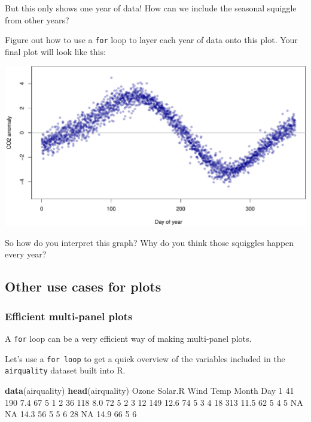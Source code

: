 \documentclass[
]{book}
\newenvironment{Shaded}{\begin{snugshade}}{\end{snugshade}}
\newcommand{\DecValTok}[1]{\textcolor[rgb]{0.00,0.00,0.81}{#1}}
\newcommand{\FloatTok}[1]{\textcolor[rgb]{0.00,0.00,0.81}{#1}}
\newcommand{\KeywordTok}[1]{\textcolor[rgb]{0.13,0.29,0.53}{\textbf{#1}}}
\newcommand{\NormalTok}[1]{#1}
\newcommand{\OtherTok}[1]{\textcolor[rgb]{0.56,0.35,0.01}{#1}}
\begin{document}
But this only shows one year of data! How can we include the seasonal squiggle from other years?

Figure out how to use a \texttt{for} loop to layer each year of data onto this plot. Your final plot will look like this:

\includegraphics{figures/unnamed-chunk-312-1.pdf}

So how do you interpret this graph? Why do you think those squiggles happen every year?

\hypertarget{other-use-cases-for-plots}{%
\subsection*{Other use cases for plots}\label{other-use-cases-for-plots}}

\hypertarget{efficient-multi-panel-plots}{%
\subsubsection*{Efficient multi-panel plots}\label{efficient-multi-panel-plots}}

A \texttt{for} loop can be a very efficient way of making multi-panel plots.

Let's use a \texttt{for\ loop} to get a quick overview of the variables included in the \texttt{airquality} dataset built into R.

\begin{Shaded}
\begin{Highlighting}[]
\KeywordTok{data}\NormalTok{(airquality)}
\KeywordTok{head}\NormalTok{(airquality)}
\NormalTok{  Ozone Solar.R Wind Temp Month Day}
\DecValTok{1}    \DecValTok{41}     \DecValTok{190}  \FloatTok{7.4}   \DecValTok{67}     \DecValTok{5}   \DecValTok{1}
\DecValTok{2}    \DecValTok{36}     \DecValTok{118}  \FloatTok{8.0}   \DecValTok{72}     \DecValTok{5}   \DecValTok{2}
\DecValTok{3}    \DecValTok{12}     \DecValTok{149} \FloatTok{12.6}   \DecValTok{74}     \DecValTok{5}   \DecValTok{3}
\DecValTok{4}    \DecValTok{18}     \DecValTok{313} \FloatTok{11.5}   \DecValTok{62}     \DecValTok{5}   \DecValTok{4}
\DecValTok{5}    \OtherTok{NA}      \OtherTok{NA} \FloatTok{14.3}   \DecValTok{56}     \DecValTok{5}   \DecValTok{5}
\DecValTok{6}    \DecValTok{28}      \OtherTok{NA} \FloatTok{14.9}   \DecValTok{66}     \DecValTok{5}   \DecValTok{6}
\end{Highlighting}
\end{Shaded}
\end{document}
